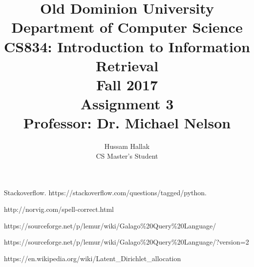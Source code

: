 \documentclass[a4paper, 11pt]{article}
\begin{document}
\author{Hussam Hallak\\
CS Master's Student}
\title{Old Dominion University\\
Department of Computer Science\\
CS834: Introduction to Information Retrieval\\
Fall 2017\\ 
Assignment 3\\
Professor: Dr. Michael Nelson}
\maketitle
\newpage

\tableofcontents
\listoffigures
\listoftables










\begin{thebibliography}{9}

\bibitem{} 
Stackoverflow. https://stackoverflow.com/questions/tagged/python.

\bibitem{}
http://norvig.com/spell-correct.html

\bibitem{} 
https://sourceforge.net/p/lemur/wiki/Galago\%20Query\%20Language/

\bibitem{}
https://sourceforge.net/p/lemur/wiki/Galago\%20Query\%20Language/?version=2

\bibitem{}
https://en.wikipedia.org/wiki/Latent\_Dirichlet\_allocation



\end{thebibliography}
\end{document}
